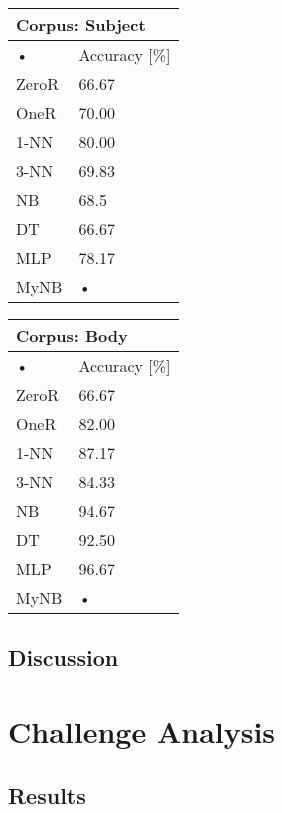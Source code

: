 \documentclass[10pt, a4paper]{article}
\begin{document}
\begin{tabular}{|l|l|}
\hline
\multicolumn{2}{|l|}{Corpus: Subject} \\
\hline
• & Accuracy [\%] \\
\hline
ZeroR & 66.67 \\
\hline
OneR & 70.00 \\
\hline
1-NN & 80.00 \\
\hline
3-NN & 69.83 \\
\hline
NB & 68.5 \\
\hline
DT & 66.67 \\
\hline
MLP & 78.17 \\
\hline
MyNB & • \\
\hline
\end{tabular}

\begin{tabular}{|l|l|}
\hline
\multicolumn{2}{|l|}{Corpus: Body} \\
\hline
• & Accuracy [\%] \\
\hline
ZeroR & 66.67 \\
\hline
OneR & 82.00 \\
\hline
1-NN & 87.17 \\
\hline
3-NN & 84.33 \\
\hline
NB & 94.67 \\
\hline
DT & 92.50 \\
\hline
MLP & 96.67 \\
\hline
MyNB & • \\
\hline
\end{tabular}

\subsection{Discussion}


\section{Challenge Analysis}

\subsection{Results}
\end{document}
